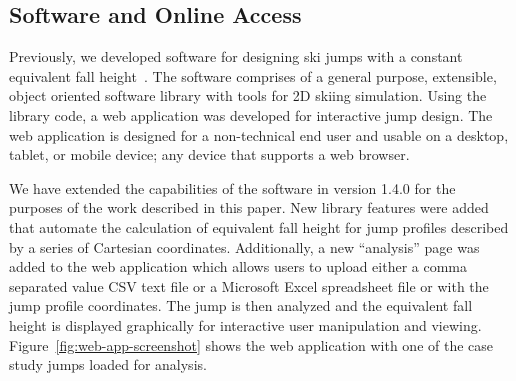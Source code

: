 \documentclass{article}
\begin{document}
\subsection{Software and Online Access}
%
Previously, we developed software for designing ski jumps with a constant
equivalent fall height~\cite{Moore2018}. The software comprises of a general
purpose, extensible, object oriented software library with tools for 2D skiing
simulation. Using the library code, a web application was developed for
interactive jump design. The web application is designed for a non-technical
end user and usable on a desktop, tablet, or mobile device; any device that
supports a web browser.

We have extended the capabilities of the software in version 1.4.0 for the
purposes of the work described in this paper. New library features were added
that automate the calculation of equivalent fall height for jump profiles
described by a series of Cartesian coordinates.  Additionally, a new
``analysis'' page was added to the web application which allows users to upload
either a comma separated value CSV text file or a Microsoft Excel spreadsheet
file or with the jump profile coordinates. The jump is then analyzed and the
equivalent fall height is displayed graphically for interactive user
manipulation and viewing. Figure~\ref{fig:web-app-screenshot} shows the web
application with one of the case study jumps loaded for analysis.
%
\end{document}
